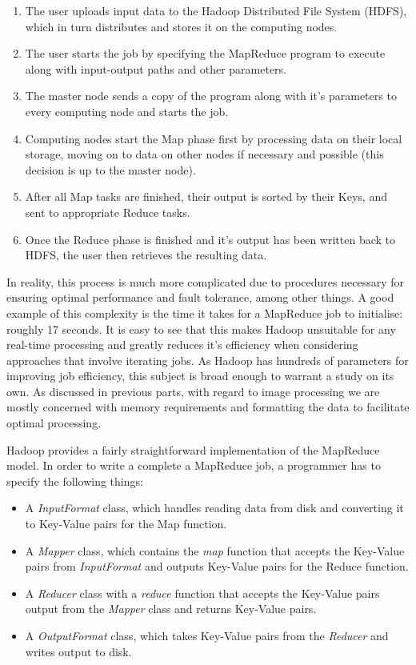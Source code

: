 \documentclass [12pt,a4paper]{report}
\begin{document}
\begin{enumerate} 
\item The user uploads input data to the Hadoop Distributed File System (HDFS), which in turn distributes and stores it on the computing nodes.
\item The user starts the job by specifying the MapReduce program to execute along with input-output paths and other parameters.
\item The master node sends a copy of the program along with it's parameters to every computing node and starts the job.
\item Computing nodes start the Map phase first by processing data on their local storage, moving on to data on other nodes if necessary and possible (this decision is up to the master node).
\item After all Map tasks are finished, their output is sorted by their Keys, and sent to appropriate Reduce tasks.
\item Once the Reduce phase is finished and it's output has been written back to HDFS, the user then retrieves the resulting data.
\end{enumerate}

In reality, this process is much more complicated due to procedures necessary for ensuring optimal performance and fault tolerance, among other things. A good example of this complexity is the time it takes for a MapReduce job to initialise: roughly 17 seconds. It is easy to see that this makes Hadoop unsuitable for any real-time processing and greatly reduces it's efficiency when considering approaches that involve iterating jobs. As Hadoop has hundreds of parameters for improving job efficiency, this subject is broad enough to warrant a study on its own. As discussed in previous parts, with regard to image processing we are mostly concerned with memory requirements and formatting the data to facilitate optimal processing.

Hadoop provides a fairly straightforward implementation of the MapReduce model. In order to write a complete a MapReduce job, a programmer has to specify the following things:

\begin{itemize}
\item A \textit{InputFormat} class, which handles reading data from disk and converting it to Key-Value pairs for the Map function. 
\item A \textit{Mapper} class, which contains the \textit{map} function that accepts the Key-Value pairs from \textit{InputFormat} and outputs Key-Value pairs for the Reduce function.
\item A \textit{Reducer} class with a \textit{reduce} function that accepts the Key-Value pairs output from the \textit{Mapper} class and returns Key-Value pairs.
\item A \textit{OutputFormat} class, which takes Key-Value pairs from the \textit{Reducer} and writes output to disk.
\end{itemize} 
\end{document}
